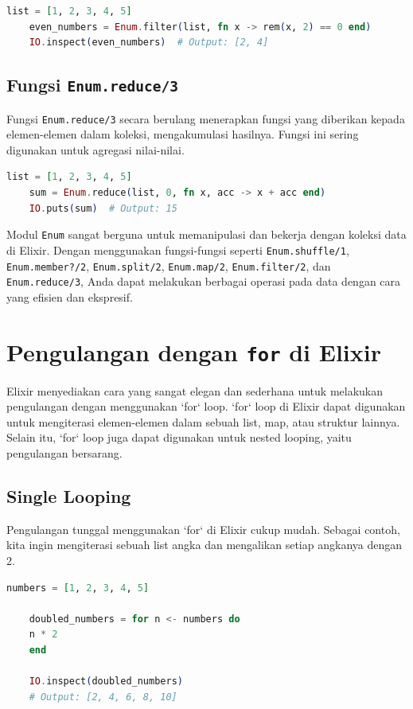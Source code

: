\begin{lstlisting}[language=Elixir]
	list = [1, 2, 3, 4, 5]
	even_numbers = Enum.filter(list, fn x -> rem(x, 2) == 0 end)
	IO.inspect(even_numbers)  # Output: [2, 4]
\end{lstlisting}

\subsection{Fungsi \texttt{Enum.reduce/3}}

Fungsi \texttt{Enum.reduce/3} secara berulang menerapkan fungsi yang diberikan kepada elemen-elemen dalam koleksi, mengakumulasi hasilnya. Fungsi ini sering digunakan untuk agregasi nilai-nilai.

\begin{lstlisting}[language=Elixir]
	list = [1, 2, 3, 4, 5]
	sum = Enum.reduce(list, 0, fn x, acc -> x + acc end)
	IO.puts(sum)  # Output: 15
\end{lstlisting}

Modul \texttt{Enum} sangat berguna untuk memanipulasi dan bekerja dengan koleksi data di Elixir. Dengan menggunakan fungsi-fungsi seperti \texttt{Enum.shuffle/1}, \texttt{Enum.member?/2}, \texttt{Enum.split/2}, \texttt{Enum.map/2}, \texttt{Enum.filter/2}, dan \texttt{Enum.reduce/3}, Anda dapat melakukan berbagai operasi pada data dengan cara yang efisien dan ekspresif.

\section{Pengulangan dengan \texttt{for} di Elixir}

Elixir menyediakan cara yang sangat elegan dan sederhana untuk melakukan pengulangan dengan menggunakan `for` loop. `for` loop di Elixir dapat digunakan untuk mengiterasi elemen-elemen dalam sebuah list, map, atau struktur lainnya. Selain itu, `for` loop juga dapat digunakan untuk nested looping, yaitu pengulangan bersarang.

\subsection{Single Looping}

Pengulangan tunggal menggunakan `for` di Elixir cukup mudah. Sebagai contoh, kita ingin mengiterasi sebuah list angka dan mengalikan setiap angkanya dengan 2.

\begin{lstlisting}[language=Elixir]
	numbers = [1, 2, 3, 4, 5]
	
	doubled_numbers = for n <- numbers do
	n * 2
	end
	
	IO.inspect(doubled_numbers)
	# Output: [2, 4, 6, 8, 10]
\end{lstlisting}

